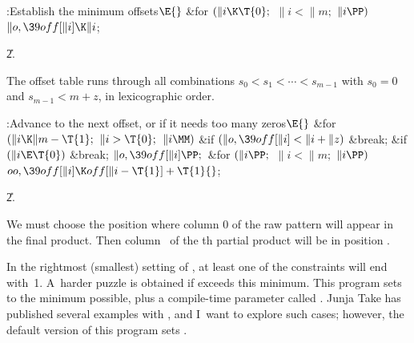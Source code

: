 \fi

\B{}:Establish the minimum offsets\X${}%
\E{}$\6
\&{for} ${}(\|i\K\T{0};{}$ ${}\|i<\|m;{}$ ${}\|i\PP){}$\1\5
${}\|o,\39\\{off}[\|i]\K\|i{}$;\2\par
\U2.\fi

The offset table runs through all
combinations $s_0<s_1<\cdots<s_{m-1}$
with $s_0=0$ and $s_{m-1}<m+z$, in lexicographic order.

\Y\B\4:Advance to the next offset, or  if it needs too many
zeros\X${}\E{}$\6
\&{for} ${}(\|i\K\|m-\T{1};{}$ ${}\|i>\T{0};{}$ ${}\|i\MM){}$\1\6
\&{if} ${}(\|o,\39\\{off}[\|i]<\|i+\|z){}$\1\5
\&{break};\2\2\6
\&{if} ${}(\|i\E\T{0}){}$\1\5
\&{break};\2\6
${}\|o,\39\\{off}[\|i]\PP;{}$\6
\&{for} ${}(\|i\PP;{}$ ${}\|i<\|m;{}$ ${}\|i\PP){}$\1\5
${}\\{oo},\39\\{off}[\|i]\K\\{off}[\|i-\T{1}]+\T{1}{}$;\2\par
\U2.\fi

We must choose the position 
where column 0 of the raw pattern
will appear in the final product. Then column~ of the th
partial
product will be in position .

In the rightmost (smallest) setting of , at least one of the
constraints will end with~1. A~harder puzzle is obtained if 
exceeds this minimum. This program sets  to the minimum possible,
plus a compile-time parameter called . Junja Take has published
several examples with , and I~want to explore such
cases;
however, the default version of this program sets .


